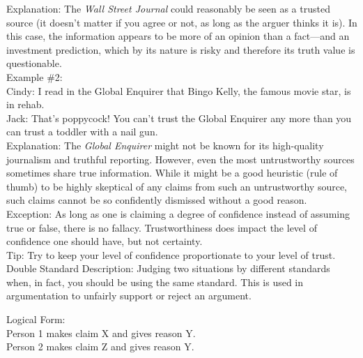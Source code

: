 \documentclass[a4paper,12pt,single,pdftex]{scrartcl}
\begin{document}
    
      Explanation: The {\it Wall Street Journal} could reasonably be seen as a trusted source (it doesn't matter if you agree or not, as long as the arguer thinks it is). In this case, the information appears to be more of an opinion than a fact—and an investment prediction, which by its nature is risky and therefore its truth value is questionable.
    \\

    
      Example \#2:
    \\

    
      Cindy: I read in the Global Enquirer that Bingo Kelly, the famous movie star, is in rehab.
    \\

    
      Jack: That's poppycock! You can't trust the Global Enquirer any more than you can trust a toddler with a nail gun.
    \\

    
      Explanation: The {\it Global Enquirer} might not be known for its high-quality journalism and truthful reporting. However, even the most untrustworthy sources sometimes share true information. While it might be a good heuristic (rule of thumb) to be highly skeptical of any claims from such an untrustworthy source, such claims cannot be so confidently dismissed without a good reason.
    \\

    
      Exception: As long as one is claiming a degree of confidence instead of assuming true or false, there is no fallacy. Trustworthiness does impact the level of confidence one should have, but not certainty.
    \\

    
      Tip: Try to keep your level of confidence proportionate to your level of trust.
    \\

  

Double Standard
    Description: Judging two situations by different standards when, in fact, you should be using the same standard. This is used in argumentation to unfairly support or reject an argument.

    
      Logical Form:
    \\

    
      Person 1 makes claim X and gives reason Y.
    \\

    
      Person 2 makes claim Z and gives reason Y.
    \\
\end{document}
